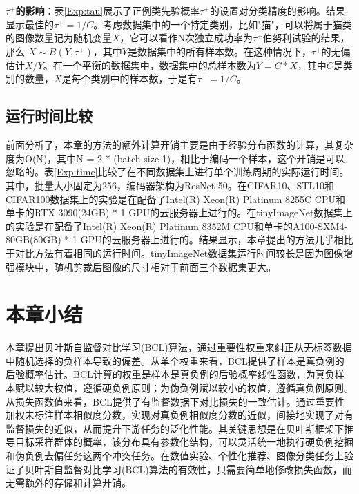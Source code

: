 \textbf{$\tau^+$的影响}：表\ref{Exp:tau}展示了正例类先验概率$\tau^+$的设置对分类精度的影响。结果显示最佳的$\tau^+ = 1/C$。考虑数据集中的一个特定类别，比如"猫"，可以将属于猫类的图像数量记为随机变量$X$，它可以看作N次独立成功率为$\tau^+$伯努利试验的结果，那么 $X\sim B(Y,\tau^+)$，其中$Y$是数据集中的所有样本数。在这种情况下，$\tau^+$的无偏估计$X/Y$。在一个平衡的数据集中，数据集中的总样本数为$Y = C * X$，其中$C$是类别的数量，$X$是每个类别中的样本数，于是有$\tau^+ = 1/C$。

\subsection{运行时间比较}
前面分析了，本章的方法的额外计算开销主要是由于经验分布函数的计算，其复杂度为O(N)，其中N = 2 * (batch size-1)，相比于编码一个样本，这个开销是可以忽略的。表\ref{Exp:time}比较了在不同数据集上进行单个训练周期的实际运行时间。其中，批量大小固定为256，编码器架构为ResNet-50。在CIFAR10、STL10和CIFAR100数据集上的实验是在配备了Intel(R) Xeon(R) Platinum 8255C CPU和单卡的RTX 3090(24GB) * 1 GPU的云服务器上进行的。在tinyImageNet数据集上的实验是在配备了Intel(R) Xeon(R) Platinum 8352M CPU和单卡的A100-SXM4-80GB(80GB) * 1 GPU的云服务器上进行的。结果显示，本章提出的方法几乎相比于对比方法有着相同的运行时间。tinyImageNet数据集运行时间较长是因为图像增强模块中，随机剪裁后图像的尺寸相对于前面三个数据集更大。
\begin{table}[h!]
	\centering
	\caption{算法运行时间比较}\label{Exp:time}
\end{table}
\section{本章小结}
本章提出贝叶斯自监督对比学习(BCL)算法，通过重要性权重来纠正从无标签数据中随机选择的负样本导致的偏差。从单个权重来看，BCL提供了样本是真负例的后验概率估计。BCL计算的权重是样本是真负例的后验概率线性函数，为真负样本赋以较大权值，遵循硬负例原则；为伪负例赋以较小的权值，遵循真负例原则。从损失函数值来看，BCL提供了有监督数据下对比损失的一致估计。通过重要性加权未标注样本相似度分数，实现对真负例相似度分数的近似，间接地实现了对有监督损失的近似，从而提升下游任务的泛化性能。其关键思想是在贝叶斯框架下推导目标采样群体的概率，该分布具有参数化结构，可以灵活统一地执行硬负例挖掘和伪负例去偏任务这两个冲突任务。在数值实验、个性化推荐、图像分类任务上验证了贝叶斯自监督对比学习(BCL)算法的有效性，只需要简单地修改损失函数，而无需额外的存储和计算开销。

